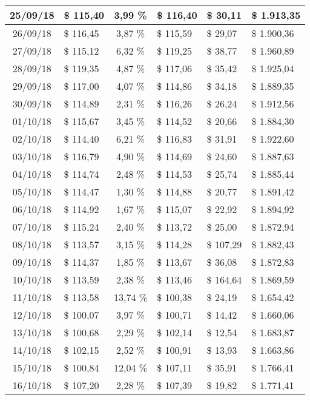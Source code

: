 \begin{center}
\begin{small}
\begin{longtable}{|c|l|c|l|l|l|}
25/09/18 & \$ 115,40 & 3,99 \% & \$ 116,40 & \$ 30,11 & \$ 1.913,35 \\ \hline
26/09/18 & \$ 116,45 & 3,87 \% & \$ 115,59 & \$ 29,07 & \$ 1.900,36 \\ \hline
27/09/18 & \$ 115,12 & 6,32 \% & \$ 119,25 & \$ 38,77 & \$ 1.960,89 \\ \hline
28/09/18 & \$ 119,35 & 4,87 \% & \$ 117,06 & \$ 35,42 & \$ 1.925,04 \\ \hline
29/09/18 & \$ 117,00 & 4,07 \% & \$ 114,86 & \$ 34,18 & \$ 1.889,35 \\ \hline
30/09/18 & \$ 114,89 & 2,31 \% & \$ 116,26 & \$ 26,24 & \$ 1.912,56 \\ \hline
01/10/18 & \$ 115,67 & 3,45 \% & \$ 114,52 & \$ 20,66 & \$ 1.884,30 \\ \hline
02/10/18 & \$ 114,40 & 6,21 \% & \$ 116,83 & \$ 31,91 & \$ 1.922,60 \\ \hline
03/10/18 & \$ 116,79 & 4,90 \% & \$ 114,69 & \$ 24,60 & \$ 1.887,63 \\ \hline
04/10/18 & \$ 114,74 & 2,48 \% & \$ 114,53 & \$ 25,74 & \$ 1.885,44 \\ \hline
05/10/18 & \$ 114,47 & 1,30 \% & \$ 114,88 & \$ 20,77 & \$ 1.891,42 \\ \hline
06/10/18 & \$ 114,92 & 1,67 \% & \$ 115,07 & \$ 22,92 & \$ 1.894,92 \\ \hline
07/10/18 & \$ 115,24 & 2,40 \% & \$ 113,72 & \$ 25,00 & \$ 1.872,94 \\ \hline
08/10/18 & \$ 113,57 & 3,15 \% & \$ 114,28 & \$ 107,29 & \$ 1.882,43 \\ \hline
09/10/18 & \$ 114,37 & 1,85 \% & \$ 113,67 & \$ 36,08 & \$ 1.872,83 \\ \hline
10/10/18 & \$ 113,59 & 2,38 \% & \$ 113,46 & \$ 164,64 & \$ 1.869,59 \\ \hline
11/10/18 & \$ 113,58 & 13,74 \% & \$ 100,38 & \$ 24,19 & \$ 1.654,42 \\ \hline
12/10/18 & \$ 100,07 & 3,97 \% & \$ 100,71 & \$ 14,42 & \$ 1.660,06 \\ \hline
13/10/18 & \$ 100,68 & 2,29 \% & \$ 102,14 & \$ 12,54 & \$ 1.683,87 \\ \hline
14/10/18 & \$ 102,15 & 2,52 \% & \$ 100,91 & \$ 13,93 & \$ 1.663,86 \\ \hline
15/10/18 & \$ 100,84 & 12,04 \% & \$ 107,11 & \$ 35,91 & \$ 1.766,41 \\ \hline
16/10/18 & \$ 107,20 & 2,28 \% & \$ 107,39 & \$ 19,82 & \$ 1.771,41 \\ \hline

\end{longtable}
\end{small}
\end{center}
